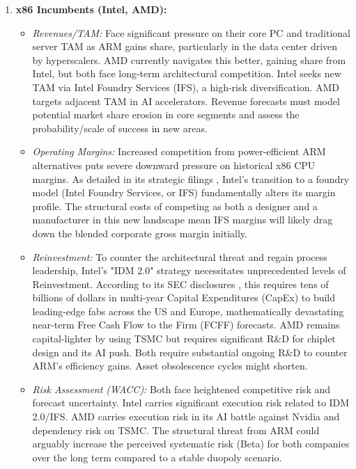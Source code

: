 \begin{enumerate}
    \item \textbf{x86 Incumbents (Intel, AMD):}
          \begin{itemize}
              \item \textit{Revenues/TAM:} Face significant pressure on their core PC and traditional server TAM as ARM gains share, particularly in the data center driven by hyperscalers. AMD currently navigates this better, gaining share from Intel, but both face long-term architectural competition. Intel seeks new TAM via Intel Foundry Services (IFS), a high-risk diversification. AMD targets adjacent TAM in AI accelerators. Revenue forecasts must model potential market share erosion in core segments and assess the probability/scale of success in new areas.
              \item \textit{Operating Margins:} Increased competition from power-efficient ARM alternatives puts severe downward pressure on historical x86 CPU margins. As detailed in its strategic filings \parencite{intel202410k}, Intel's transition to a foundry model (Intel Foundry Services, or IFS) fundamentally alters its margin profile. The structural costs of competing as both a designer and a manufacturer in this new landscape mean IFS margins will likely drag down the blended corporate gross margin initially.
              \item \textit{Reinvestment:} To counter the architectural threat and regain process leadership, Intel's "IDM 2.0" strategy necessitates unprecedented levels of Reinvestment. According to its SEC disclosures \parencite{intel202410k}, this requires tens of billions of dollars in multi-year Capital Expenditures (CapEx) to build leading-edge fabs across the US and Europe, mathematically devastating near-term Free Cash Flow to the Firm (FCFF) forecasts. AMD remains capital-lighter by using TSMC but requires significant R\&D for chiplet design and its AI push. Both require substantial ongoing R\&D to counter ARM's efficiency gains. Asset obsolescence cycles might shorten.
              \item \textit{Risk Assessment (WACC):} Both face heightened competitive risk and forecast uncertainty. Intel carries significant execution risk related to IDM 2.0/IFS. AMD carries execution risk in its AI battle against Nvidia and dependency risk on TSMC. The structural threat from ARM could arguably increase the perceived systematic risk (Beta) for both companies over the long term compared to a stable duopoly scenario.
          \end{itemize}


\end{enumerate}

